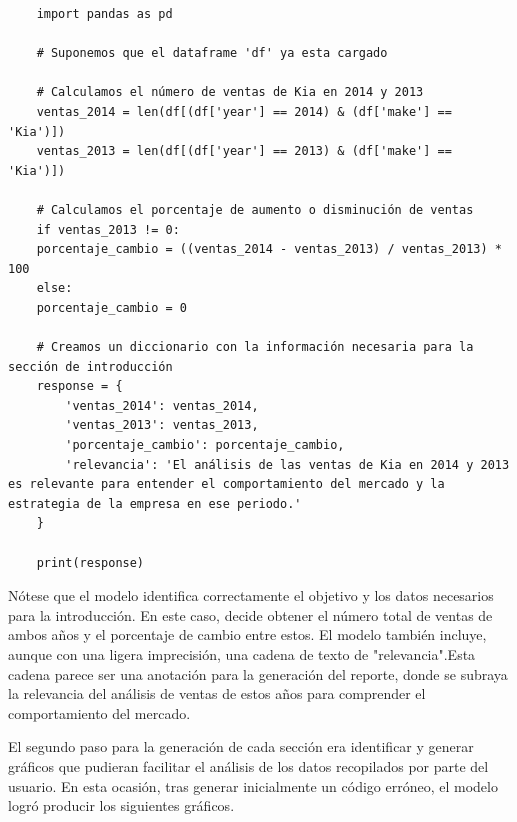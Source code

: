\begin{lstlisting}
	import pandas as pd
	
	# Suponemos que el dataframe 'df' ya esta cargado
	
	# Calculamos el número de ventas de Kia en 2014 y 2013
	ventas_2014 = len(df[(df['year'] == 2014) & (df['make'] == 'Kia')])
	ventas_2013 = len(df[(df['year'] == 2013) & (df['make'] == 'Kia')])
	
	# Calculamos el porcentaje de aumento o disminución de ventas
	if ventas_2013 != 0:
	porcentaje_cambio = ((ventas_2014 - ventas_2013) / ventas_2013) * 100
	else:
	porcentaje_cambio = 0
	
	# Creamos un diccionario con la información necesaria para la sección de introducción
	response = {
		'ventas_2014': ventas_2014,
		'ventas_2013': ventas_2013,
		'porcentaje_cambio': porcentaje_cambio,
		'relevancia': 'El análisis de las ventas de Kia en 2014 y 2013 es relevante para entender el comportamiento del mercado y la estrategia de la empresa en ese periodo.'
	}
	
	print(response)
\end{lstlisting}

Nótese que el modelo identifica correctamente el objetivo y los datos necesarios para la introducción.  En este caso, decide obtener el número total de ventas de ambos años y el porcentaje de cambio entre estos. El modelo también incluye, aunque con una ligera imprecisión, una cadena de texto de "relevancia".Esta cadena parece ser una anotación para la generación del reporte, donde se subraya la relevancia del análisis de ventas de estos años para comprender el comportamiento del mercado.

El segundo paso para la generación de cada sección era identificar y generar gráficos que pudieran facilitar el análisis de los datos recopilados por parte del usuario. En esta ocasión, tras generar inicialmente un código erróneo, el modelo logró producir los siguientes gráficos.

